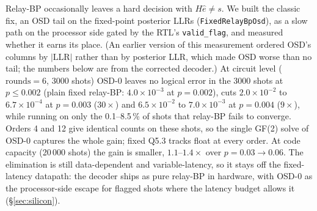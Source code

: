 Relay-BP occasionally leaves a hard decision with $H\hat e\ne s$. We built the
classic fix, an OSD tail on the fixed-point posterior LLRs
(\texttt{FixedRelayBpOsd}), as a slow path on the processor side gated by the
RTL's \texttt{valid\_flag}, and measured whether it earns its place. (An
earlier version of this measurement ordered OSD's columns by $|\mathrm{LLR}|$
rather than by posterior LLR, which made OSD worse than no tail; the numbers
below are from the corrected decoder.)
At circuit level ($\mathrm{rounds}=6$, 3000 shots) OSD-0 leaves no logical
error in the 3000 shots at $p\le0.002$ (plain fixed relay-BP:
$4.0\times10^{-3}$ at $p=0.002$), cuts $2.0\times10^{-2}$ to $6.7\times10^{-4}$ at $p=0.003$
($30\times$) and $6.5\times10^{-2}$ to $7.0\times10^{-3}$ at $p=0.004$
($9\times$), while running on only the 0.1--8.5\,\% of shots that relay-BP
fails to converge. Orders 4 and 12 give identical counts on these shots, so the
single GF(2) solve of OSD-0 captures the whole gain; fixed Q5.3 tracks float
at every order.
At code capacity (20\,000 shots) the gain is smaller, $1.1$--$1.4\times$ over
$p=0.03\to0.06$.
The elimination is still data-dependent and variable-latency, so it stays off
the fixed-latency datapath: the decoder ships as pure relay-BP in hardware, with
OSD-0 as the processor-side escape for flagged shots where the latency budget
allows it (\S\ref{sec:silicon}).
